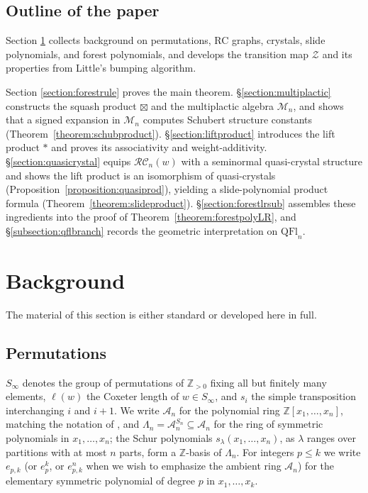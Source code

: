 \documentclass{amsart}
\theoremstyle{definition}
\theoremstyle{remark}
\numberwithin{equation}{subsection}
\newcommand{\zeromap}{\mathcal{Z}}
\newcommand{\RC}{\mathcal{RC}}
\newcommand{\coma}{\mathcal{A}}
\begin{document}
\subsection*{Outline of the paper}

Section \ref{section:background} collects background on permutations, RC graphs, crystals, slide polynomials, and forest polynomials, and develops the transition map $\zeromap$ and its properties from Little's bumping algorithm.

Section \ref{section:forestrule} proves the main theorem. \S\ref{section:multiplactic} constructs the squash product $\boxtimes$ and the multiplactic algebra $\mathcal{M}_n$, and shows that a signed expansion in $\mathcal{M}_n$ computes Schubert structure constants (Theorem~\ref{theorem:schubproduct}). \S\ref{section:liftproduct} introduces the lift product $*$ and proves its associativity and weight-additivity. \S\ref{section:quasicrystal} equips $\RC_n(w)$ with a seminormal quasi-crystal structure and shows the lift product is an isomorphism of quasi-crystals (Proposition~\ref{proposition:quasiprod}), yielding a slide-polynomial product formula (Theorem~\ref{theorem:slideproduct}). \S\ref{section:forestlrsub} assembles these ingredients into the proof of Theorem~\ref{theorem:forestpolyLR}, and \S\ref{subsection:qflbranch} records the geometric interpretation on $\mathrm{QFl}_n$.

\section{Background}\label{section:background}

The material of this section is either standard or developed here in full.

\subsection{Permutations}

$S_\infty$ denotes the group of permutations of $\mathbb{Z}_{>0}$ fixing all but finitely many elements, $\ell(w)$ the Coxeter length of $w\in S_\infty$, and $s_i$ the simple transposition interchanging $i$ and $i+1$. We write $\coma_n$ for the polynomial ring $\mathbb{Z}[x_1,\ldots,x_n]$, matching the notation of \cite{companionbialgebra}, and $\Lambda_n=\coma_n^{S_n}\subseteq\coma_n$ for the ring of symmetric polynomials in $x_1,\ldots,x_n$; the Schur polynomials $s_\lambda(x_1,\ldots,x_n)$, as $\lambda$ ranges over partitions with at most $n$ parts, form a $\mathbb{Z}$-basis of $\Lambda_n$. For integers $p\leq k$ we write $e_{p,k}$ (or $e_p^k$, or $e_{p,k}^n$ when we wish to emphasize the ambient ring $\coma_n$) for the elementary symmetric polynomial of degree $p$ in $x_1,\ldots,x_k$.
\end{document}
